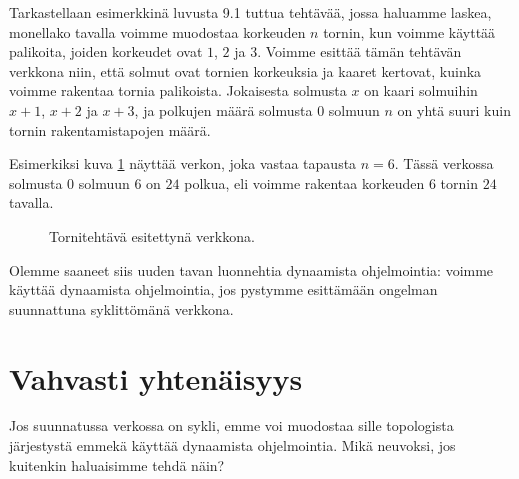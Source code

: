 Tarkastellaan esimerkkinä luvusta 9.1 tuttua tehtävää,
jossa haluamme laskea, monellako tavalla voimme muodostaa
korkeuden $n$ tornin, kun voimme käyttää palikoita,
joiden korkeudet ovat $1$, $2$ ja $3$.
Voimme esittää tämän tehtävän verkkona niin,
että solmut ovat tornien korkeuksia ja kaaret kertovat,
kuinka voimme rakentaa tornia palikoista.
Jokaisesta solmusta $x$ on kaari solmuihin
$x+1$, $x+2$ ja $x+3$,
ja polkujen määrä solmusta $0$ solmuun $n$
on yhtä suuri kuin tornin rakentamistapojen määrä.

Esimerkiksi kuva \ref{fig:verkol} näyttää verkon,
joka vastaa tapausta $n=6$.
Tässä verkossa solmusta $0$ solmuun $6$ on $24$ polkua,
eli voimme rakentaa korkeuden $6$ tornin $24$ tavalla.

\begin{figure}
\center
\begin{center}
\end{center}
\caption{Tornitehtävä esitettynä verkkona.}
\label{fig:verkol}
\end{figure}

Olemme saaneet siis uuden tavan luonnehtia dynaamista ohjelmointia:
voimme käyttää dynaamista ohjelmointia,
jos pystymme esittämään ongelman suunnattuna syklittömänä verkkona.

\section{Vahvasti yhtenäisyys}

Jos suunnatussa verkossa on sykli,
emme voi muodostaa sille topologista järjestystä
emmekä käyttää dynaamista ohjelmointia.
Mikä neuvoksi, jos kuitenkin haluaisimme tehdä näin?

